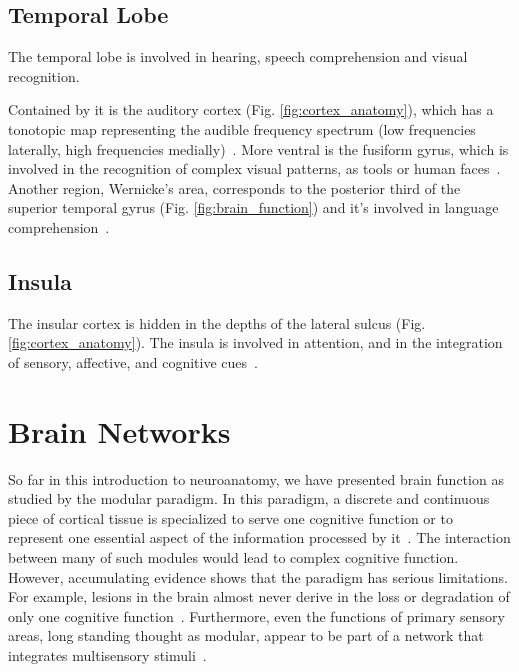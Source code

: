 \subsection{Temporal Lobe}
The temporal lobe is involved in hearing, speech comprehension and visual recognition.

Contained by it is the auditory cortex (Fig. \ref{fig:cortex_anatomy}), which 
has a tonotopic map representing the audible frequency spectrum (low frequencies
laterally, high frequencies medially)~\cite{Johns}. More ventral is the fusiform
gyrus, which is involved in the recognition of complex visual patterns, as tools
or human faces~\cite{Saygin2011}. Another region, Wernicke’s area, corresponds to the 
posterior third of the superior temporal gyrus (Fig. \ref{fig:brain_function}) and
it's involved in language comprehension~\cite{Johns}. 

\subsection{Insula}
The insular cortex is hidden in the depths of the lateral sulcus (Fig.
\ref{fig:cortex_anatomy}). The insula is involved in attention, and in the
integration of sensory, affective, and cognitive cues~\cite{Bressler2010, Johns}.

\section{Brain Networks}

So far in this introduction to neuroanatomy, we have presented brain function
as studied by the modular paradigm.
In this paradigm, a discrete and continuous piece of cortical tissue is specialized
to serve one cognitive function or to represent one essential aspect of the
information processed by it~\cite{Fuster2000}. The interaction between many
of such modules would lead to complex cognitive function. However, accumulating
evidence shows that the paradigm has serious limitations. For example, lesions
in the brain almost never derive in the loss or degradation of only one cognitive
function~\cite{Fuster2000}. Furthermore, even the functions of primary sensory
areas, long standing thought as modular, appear to be part of a network that
integrates multisensory stimuli~\cite{Ghazanfar2006}.

